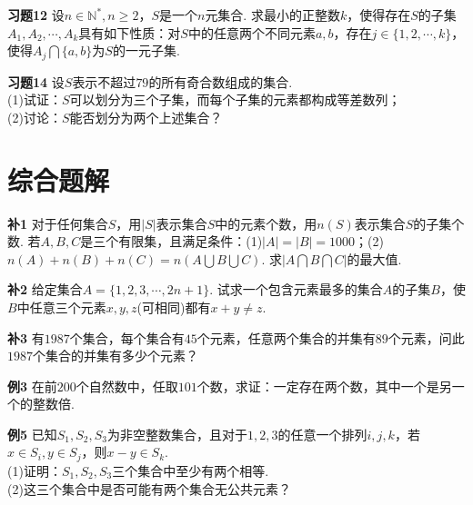 \documentclass[lang=cn, zihao=4.5]{elegantbook}
\begin{document}
\vspace{30em}
\noindent %
	\textbf{习题12} \quad 设$n \in \mathbb{N}^*,n \geq 2$，$S$是一个$n$元集合. 求最小的正整数$k$，使得存在$S$的子集$A_1,A_2, \cdots ,A_k$具有如下性质：对$S$中的任意两个不同元素$a,b$，存在$j \in \{1,2, \cdots ,k\}$，使得$A_j \bigcap \{a,b\}$为$S$的一元子集.
	
\newpage
\noindent %
	\textbf{习题14} \quad 设$S$表示不超过$79$的所有奇合数组成的集合. \\
    (1)试证：$S$可以划分为三个子集，而每个子集的元素都构成等差数列；\\
    (2)讨论：$S$能否划分为两个上述集合？ 
    
    



\newpage
\section{综合题解}

\newpage
\noindent %
	\textbf{补1} \quad 对于任何集合$S$，用$|S|$表示集合$S$中的元素个数，用$n(S)$表示集合$S$的子集个数. 若$A,B,C$是三个有限集，且满足条件：(1)$|A|=|B|=1000$；(2)$n(A)+n(B)+n(C)=n(A \bigcup B \bigcup C)$. 求$|A \bigcap B \bigcap C|$的最大值.
	
\vspace{30em}
\noindent %
	\textbf{补2} \quad 给定集合$A= \{1,2,3, \cdots ,2n+1 \}$. 试求一个包含元素最多的集合$A$的子集$B$，使$B$中任意三个元素$x,y,z$(可相同)都有$x+y \neq z$.
	
\newpage	
\noindent %
	\textbf{补3} \quad 有$1987$个集合，每个集合有$45$个元素，任意两个集合的并集有$89$个元素，问此$1987$个集合的并集有多少个元素？
	
\vspace{30em}
\noindent %
	\textbf{例3} \quad 在前$200$个自然数中，任取$101$个数，求证：一定存在两个数，其中一个是另一个的整数倍.
	
\newpage	
\noindent %
	\textbf{例5} \quad 已知$S_1,S_2,S_3$为非空整数集合，且对于$1,2,3$的任意一个排列$i,j,k$，若$x \in S_i, y \in S_j$，则$x-y \in S_k$.\\
    (1)证明：$S_1,S_2,S_3$三个集合中至少有两个相等.\\
    (2)这三个集合中是否可能有两个集合无公共元素？
    
\end{document}
